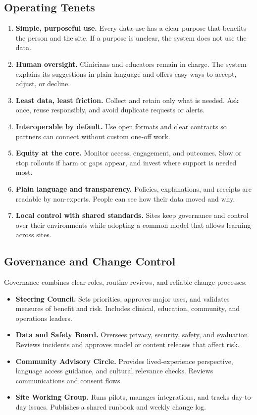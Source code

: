 \documentclass[12pt]{article}
\begin{document}
\subsection*{Operating Tenets}
\begin{enumerate}[leftmargin=*]
  \item \textbf{Simple, purposeful use.} Every data use has a clear purpose that benefits the person and the site. If a purpose is unclear, the system does not use the data.
  \item \textbf{Human oversight.} Clinicians and educators remain in charge. The system explains its suggestions in plain language and offers easy ways to accept, adjust, or decline.
  \item \textbf{Least data, least friction.} Collect and retain only what is needed. Ask once, reuse responsibly, and avoid duplicate requests or alerts.
  \item \textbf{Interoperable by default.} Use open formats and clear contracts so partners can connect without custom one-off work.
  \item \textbf{Equity at the core.} Monitor access, engagement, and outcomes. Slow or stop rollouts if harm or gaps appear, and invest where support is needed most.
  \item \textbf{Plain language and transparency.} Policies, explanations, and receipts are readable by non-experts. People can see how their data moved and why.
  \item \textbf{Local control with shared standards.} Sites keep governance and control over their environments while adopting a common model that allows learning across sites.
\end{enumerate}

\subsection*{Governance and Change Control}
Governance combines clear roles, routine reviews, and reliable change processes:
\begin{itemize}[leftmargin=*]
  \item \textbf{Steering Council.} Sets priorities, approves major uses, and validates measures of benefit and risk. Includes clinical, education, community, and operations leaders.
  \item \textbf{Data and Safety Board.} Oversees privacy, security, safety, and evaluation. Reviews incidents and approves model or content releases that affect risk.
  \item \textbf{Community Advisory Circle.} Provides lived-experience perspective, language access guidance, and cultural relevance checks. Reviews communications and consent flows.
  \item \textbf{Site Working Group.} Runs pilots, manages integrations, and tracks day-to-day issues. Publishes a shared runbook and weekly change log.
\end{itemize}
\end{document}
